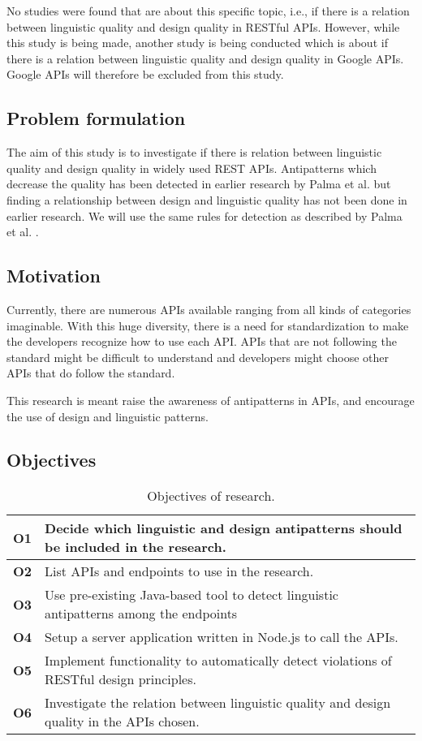 No studies were found that are about this specific topic, i.e., if there is a relation between linguistic quality and design quality in RESTful APIs. However, while this study is being made, another study is being conducted which is about if there is a relation between linguistic quality and design quality in Google APIs. Google APIs will therefore be excluded from this study.

\subsection{Problem formulation}
The aim of this study is to investigate if there is relation between  linguistic quality and design quality in widely used REST APIs. Antipatterns which decrease the quality has been detected in earlier research by Palma et al. \cite{linguistic}\cite{design} but finding a relationship between design and linguistic quality has not been done in earlier research. We will use the same rules for detection as described by Palma et al. \cite{linguistic} \cite{design}.

\subsection{Motivation}
Currently, there are numerous APIs available ranging from all kinds of categories imaginable. With this huge diversity, there is a need for standardization to make the developers recognize how to use each API. APIs that are not following the standard might be difficult to understand and developers might choose other APIs that do follow the standard.

This research is meant raise the awareness of antipatterns in APIs, and encourage the use of design and linguistic patterns. 

\subsection{Objectives}


\begin{table}[!ht]
\begin{center}
\begin{tabular} {|p{1.2cm}|p{11.6cm}|} \hline
\textbf{O1} & Decide which linguistic and design antipatterns should be included in the research. \\ \hline
\textbf{O2} & List APIs and endpoints to use in the research. \\ \hline
\textbf{O3} & Use pre-existing Java-based tool to detect linguistic antipatterns among the endpoints \\ \hline
\textbf{O4} & Setup a server application written in Node.js to call the APIs. \\ \hline
\textbf{O5} & Implement functionality to automatically detect violations of RESTful design principles.\\ \hline
\textbf{O6} & Investigate the relation between linguistic quality and design quality in the APIs chosen. \\ \hline
\end{tabular}
 \caption{Objectives of research.}
 \label{tab:Objectives}
\end{center} 
\end{table}

